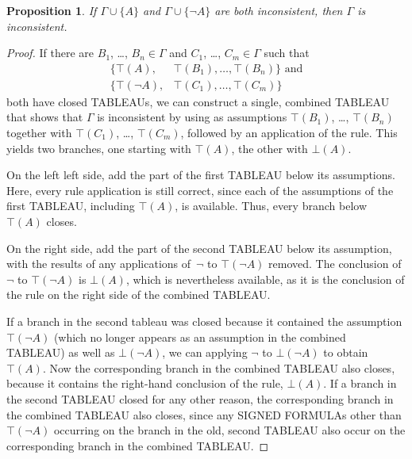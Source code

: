\documentclass[10pt,a4paper]{article}
\newcommand*{\olup}[1]{\MakeUppercase{#1}}
\theoremstyle{plain}
\newtheorem{prop}[thm]{Proposition}
\theoremstyle{definition}
\theoremstyle{remark}
\newcommand*{\ollabel}[1]{\label{#1}}
\providecommand{\sFmla}[2]{#1(#2)}
\providecommand{\True}{\top}
\providecommand{\False}{\bot}
\providecommand{\TRule}[1]{}
\providecommand{\Cut}{\mathrm{Cut}}
\begin{document}
\begin{prop}\ollabel{prop:provability-exhaustive}
  If $\Gamma \cup \{A\}$ and $\Gamma \cup \{\lnot A\}$ are both
  inconsistent, then $\Gamma$ is inconsistent.
\end{prop}

\begin{proof}
  If there are $B_1$, \dots, $B_n \in \Gamma$ and $C_1$, \dots,
  $C_m \in \Gamma$ such that
  \begin{align*}
    \{\sFmla{\True}{A}, &
    \sFmla{\True}{B_1}, \dots, \sFmla{\True}{B_n}\} \text{ and}\\
    \{\sFmla{\True}{\lnot A}, &
    \sFmla{\True}{C_1}, \dots, \sFmla{\True}{C_m}\}
  \end{align*}
  both have closed \olup{tableau}s, we can construct a single, combined
  \olup{tableau} that shows that $\Gamma$ is inconsistent by using as
  assumptions $\sFmla{\True}{B_1}$, \dots, $\sFmla{\True}{B_n}$
  together with $\sFmla{\True}{C_1}$, \dots, $\sFmla{\True}{C_m}$,
  followed by an application of the \Cut{} rule. This yields two
  branches, one starting with $\sFmla{\True}{A}$, the other with
  $\sFmla{\False}{A}$.  
  
  On the left left side, add the part of the first
  \olup{tableau} below its assumptions. Here, every rule application is still
  correct, since each of the assumptions of the first \olup{tableau},
  including $\sFmla{\True}{A}$, is available. Thus, every branch
  below $\sFmla{\True}{A}$ closes. 
  
  On the right side, add the part of the second \olup{tableau} below its
  assumption, with the results of any applications
  of~$\TRule{\True}{\lnot}$ to $\sFmla{\True}{\lnot A}$ removed.  The
  conclusion of $\TRule{\True}{\lnot}$ to $\sFmla{\True}{\lnot A}$ is
  $\sFmla{\False}{A}$, which is nevertheless available, as it is the
  conclusion of the \Cut{} rule on the right side of the combined \olup{tableau}.

  If a branch in the second tableau was closed because it contained
  the assumption $\sFmla{\True}{\lnot A}$ (which no longer appears as
  an assumption in the combined \olup{tableau}) as well as
  $\sFmla{\False}{\lnot A}$, we can applying $\TRule{\False}{\lnot}$
  to $\sFmla{\False}{\lnot A}$ to obtain $\sFmla{\True}{A}$. Now the
  corresponding branch in the combined \olup{tableau} also closes,
  because it contains the right-hand conclusion of the \Cut{} rule,
  $\sFmla{\False}{A}$. If a branch in the second \olup{tableau} closed
  for any other reason, the corresponding branch in the combined
  \olup{tableau} also closes, since any \olup{signed formula}s other than
  $\sFmla{\True}{\lnot A}$ occurring on the branch in the old, second
  \olup{tableau} also occur on the corresponding branch in the combined
  \olup{tableau}.
  \end{proof}
\end{document}
